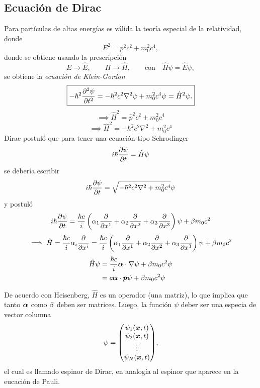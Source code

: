 \subsection{Ecuación de Dirac}
Para partículas de altas energías es válida la teoría especial de la relatividad, donde
\begin{equation}
  E^2=p^2c^2+m_0^2c^4,
\end{equation}
donde se obtiene usando la prescripción
\begin{equation}
  E\to \hat{E},\qquad H\to \hat{H},\qquad \text{con}\quad  \hat{H}\psi=\hat{E}\psi,
\end{equation}
se obtiene la \textit{ecuación de Klein-Gordon}
\begin{equation}\label{22.2}
\boxed{  -\hbar^2\pdv[2]{\psi}{t}=-\hbar^2c^2\nabla^2\psi+m_0^2c^4\psi=\hat{H}^2\psi.}
\end{equation}
\begin{equation}
  \implies \hat{H}^2=\hat{p}^2c^2+m_0^2c^4
\end{equation}
\begin{equation}
  \implies \boxed{\hat{H}^2=-\hbar^2c^2\nabla^2+m_0^2c^4}
\end{equation}
Dirac postuló que para tener una ecuación tipo Schrodinger
\begin{equation}
  i\hbar \pdv{\psi}{t}=\hat{H}\psi
\end{equation}
se debería escribir
\begin{equation}
  i\hbar\pdv{\psi}{t}=\sqrt{-\hbar^2c^2\nabla^2+m_0^2c^4}\psi 
\end{equation}
y postuló
\begin{equation}\label{22.1}
   i\hbar\pdv{\psi}{t}=\frac{\hbar c}{i}\left(\alpha_1\pdv{x^1}+\alpha_2\pdv{x^2}+\alpha_3\pdv{x^3}\right)\psi+\beta m_0c^2
\end{equation}
\begin{equation}
  \implies \hat{H}=\frac{\hbar c}{i}\alpha_i\pdv{x^{i}}=\frac{\hbar c}{i}\left(\alpha_1\pdv{x^1}+\alpha_2\pdv{x^2}+\alpha_3\pdv{x^3}\right)\psi+\beta m_0c^2
\end{equation}
\begin{align}
  \hat{H}\psi &=\frac{\hbar c}{i}\vb*{\alpha }\cdot\nabla \psi+\beta m_0c^2\psi\\
  &=c\vb*{\alpha }\cdot\vb*{p}\psi+\beta m_0c^2\psi
\end{align}

De acuerdo con Heisenberg, $\hat{H}$ es un operador (una matriz), lo que implica que tanto $\vb*{\alpha }$ como $\beta$ deben ser matrices. Luego, la función $\psi$ deber ser una especia de vector columna
\begin{equation}
  \psi=\mqty(\psi_1\xt \\
  \psi_2\xt \\
  \vdots\\
  \psi_N\xt),
\end{equation}
el cual es llamado espinor de Dirac, en analogía al espinor que aparece en la eucación de Pauli.

